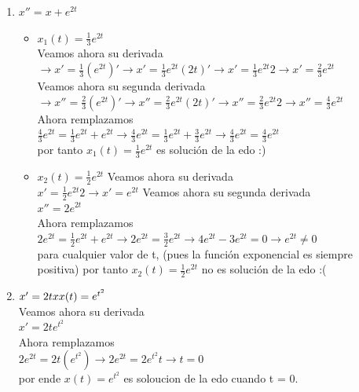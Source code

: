 \documentclass{book}
\begin{document}
    \begin{enumerate}
        \item $x''= x +e^{2t}$
            \begin{itemize}
                \item  $x_{1}(t)=\frac{1}{3}e^{2t}$\\
                Veamos ahora su derivada\\
                $\rightarrow x'=\frac{1}{3}(e^{2t})' \rightarrow x'=\frac{1}{3}e^{2t}(2t)' \rightarrow x'=\frac{1}{3}e^{2t}2
                \rightarrow x'=\frac{2}{3}e^{2t}$\\
                Veamos ahora su segunda derivada\\
                $\rightarrow x''=\frac{2}{3}(e^{2t})' \rightarrow x''=\frac{2}{3}e^{2t}(2t)' \rightarrow x''=\frac{2}{3}e^{2t}2
                \rightarrow x''=\frac{4}{3}e^{2t}$\\ 
                Ahora remplazamos\\
                $\frac{4}{3}e^{2t}= \frac{1}{3}e^{2t} +e^{2t} \rightarrow \frac{4}{3}e^{2t} =  \frac{1}{3}e^{2t} + \frac{3}{3}e^{2t} 
                \rightarrow \frac{4}{3}e^{2t} = \frac{4}{3}e^{2t}$
                \\ por tanto $x_{1}(t)=\frac{1}{3}e^{2t}$ es solución de la edo :)
                
                \item $x_{2}(t)=\frac{1}{2}e^{2t}$
                Veamos ahora su derivada\\
                $x'=\frac{1}{2}e^{2t}2 \rightarrow x'=e^{2t}$
                Veamos ahora su segunda derivada\\
                $x''= 2e^{2t}$\\ 
                Ahora remplazamos\\
                $2e^{2t}= \frac{1}{2}e^{2t} + e^{2t} \rightarrow 2e^{2t} =  \frac{3}{2}e^{2t} \rightarrow 4e^{2t} - 3e^{2t} =0
                \rightarrow e^{2t} \not = 0$\\ para cualquier valor de t, (pues la función exponencial es siempre positiva) 
                por tanto $x_{2}(t)=\frac{1}{2}e^{2t}$ no es solución de la edo :(
            \end{itemize}
        \item $x'=2tx\\  x(t)=e^{t^{2}}$\\ 
        Veamos ahora su derivada\\
        $x'=2te^{t^{2}}$\\
        Ahora remplazamos\\
        $2e^{2t}= 2t(e^{t^{2}}) \rightarrow 2e^{2t}= 2e^{t^{2}}t \rightarrow t = 0$\\
        por ende $x(t)=e^{t^{2}}$ es soloucion de la edo cuando t = 0. 
        

\end{enumerate}
\end{document}
